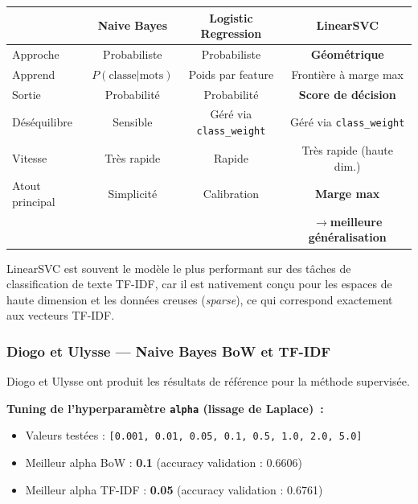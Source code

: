 \documentclass[12pt,a4paper]{article}
\begin{document}
\begin{center}
\renewcommand{\arraystretch}{1.2}
\begin{tabular}{lccc}
\toprule
 & \textbf{Naive Bayes} & \textbf{Logistic Regression} & \textbf{LinearSVC} \\
\midrule
Approche        & Probabiliste        & Probabiliste                  & \textbf{Géométrique} \\
Apprend         & $P(\text{classe}|\text{mots})$ & Poids par feature & Frontière à marge max \\
Sortie          & Probabilité         & Probabilité                   & \textbf{Score de décision} \\
Déséquilibre    & Sensible            & Géré via \texttt{class\_weight} & Géré via \texttt{class\_weight} \\
Vitesse         & Très rapide         & Rapide                        & Très rapide (haute dim.) \\
Atout principal & Simplicité          & Calibration                   & \textbf{Marge max} \\
                &                     &                               & $\rightarrow$\textbf{meilleure généralisation} \\
\bottomrule
\end{tabular}
\end{center}

\begin{remarque}
LinearSVC est souvent le modèle le plus performant sur des tâches de classification de texte TF-IDF, car il est nativement conçu pour les espaces de haute dimension et les données creuses (\textit{sparse}), ce qui correspond exactement aux vecteurs TF-IDF.
\end{remarque}

\pagebreak
\subsubsection{Diogo et Ulysse --- Naive Bayes BoW et TF-IDF}

Diogo et Ulysse ont produit les résultats de référence pour la méthode supervisée.

\textbf{Tuning de l'hyperparamètre \texttt{alpha} (lissage de Laplace)~:}
\begin{itemize}
  \item Valeurs testées : \texttt{[0.001, 0.01, 0.05, 0.1, 0.5, 1.0, 2.0, 5.0]}
  \item Meilleur alpha BoW : \textbf{0.1} (accuracy validation : 0.6606)
  \item Meilleur alpha TF-IDF : \textbf{0.05} (accuracy validation : 0.6761)
\end{itemize}
\end{document}
